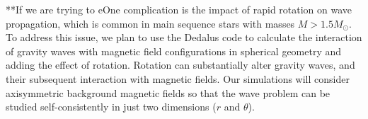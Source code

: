 **If we are trying to eOne complication is the impact of rapid rotation on wave propagation, which is common in main sequence stars with masses $M > 1.5M_\odot$. To address this issue, we plan to use the Dedalus code to calculate the interaction of gravity waves with  magnetic field configurations in spherical geometry \citep[e.g.][]{Braithwaite_2006} and adding the effect of rotation. Rotation can substantially alter gravity waves, and their subsequent interaction with magnetic fields. Our simulations will consider axisymmetric background magnetic fields so that the wave problem can be studied self-consistently in just two dimensions ($r$ and $\theta$). 